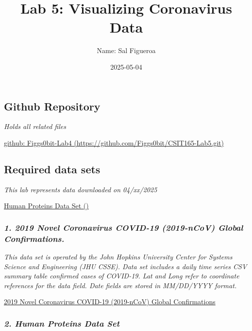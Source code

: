 \documentclass[
]{article}
\title{Lab 5: Visualizing Coronavirus Data}
\author{Name: Sal Figueroa}
\date{2025-05-04}
\begin{document}
\maketitle

{
\setcounter{tocdepth}{3}
\tableofcontents
}
\subsection{Github Repository}\label{github-repository}

\emph{Holds all related files}

\href{https://github.com/Figgs0bit/CSIT165-Lab5}{github: Figgs0bit-Lab4
(https://github.com/Figgs0bit/CSIT165-Lab5.git)}

\subsection{Required data sets}\label{required-data-sets}

\emph{This lab represents data downloaded on 04/xx/2025}

\href{https://github.com/CSSEGISandData/COVID-19/tree/master/csse_covid_19_data/csse_covid_19_time_series}{Human
Proteins Data Set ()}

\subsubsection{\texorpdfstring{\emph{1. 2019 Novel Coronavirus COVID-19
(2019-nCoV) Global
Confirmations.}}{1. 2019 Novel Coronavirus COVID-19 (2019-nCoV) Global Confirmations.}}\label{novel-coronavirus-covid-19-2019-ncov-global-confirmations.}

\emph{This data set is operated by the John Hopkins University Center
for Systems Science and Engineering (JHU CSSE). Data set includes a
daily time series CSV summary table confirmed cases of COVID-19. Lat and
Long refer to coordinate references for the data field. Date fields are
stored in MM/DD/YYYY format.}

\href{https://github.com/CSSEGISandData/COVID-19/tree/master/csse_covid_19_data/csse_covid_19_time_series}{2019
Novel Coronavirus COVID-19 (2019-nCoV) Global Confirmations}

\subsubsection{\texorpdfstring{\emph{2. Human Proteins Data
Set}}{2. Human Proteins Data Set}}\label{human-proteins-data-set}
\end{document}
